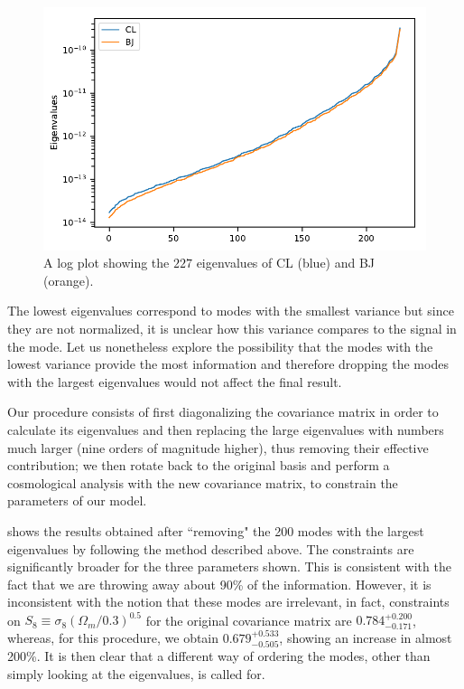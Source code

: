 \documentclass[twocolumn]{\docclass}
\begin{document}
	
	\begin{figure}
		\includegraphics[width=0.9\columnwidth]{Eigenvalues/Eigenvalues_Y1_BJ-DES.pdf}
		\caption{A log plot showing the $227$ eigenvalues of CL (blue) and BJ (orange). \label{fig:coveigen}}
	\end{figure}
	
	
	The lowest eigenvalues correspond to modes with the smallest variance but since they are not normalized, it is unclear how this variance compares to the signal in the mode. Let us nonetheless explore the possibility that the modes with the lowest variance provide the most information and therefore dropping the modes with the largest eigenvalues would not affect the final result.
	
	Our procedure consists of first diagonalizing the covariance matrix in order to calculate its eigenvalues and then replacing the large eigenvalues with numbers much larger (nine orders of magnitude higher), thus removing their effective contribution; we then rotate back to the original basis and perform a cosmological analysis with the new covariance matrix, to constrain the parameters of our model. 
	
	 shows the results obtained after ``removing" the 200 modes with the largest eigenvalues by following the method described above.  The constraints are significantly broader for the three parameters shown. This is consistent with the fact that we are throwing away about 90\% of the information. However, it is inconsistent with the notion that these modes are irrelevant, in fact, constraints on $S_8\equiv \sigma_8 (\Omega_m/0.3)^{0.5}$ for the original covariance matrix are $0.784^{+ 0.200}_{- 0.171}$, whereas, for this procedure, we obtain $0.679^{+ 0.533}_{- 0.505}$, showing an increase in almost 200\%. It is then clear that a different way of ordering the modes, other than simply looking at the eigenvalues, is called for.	
	
\end{document}
